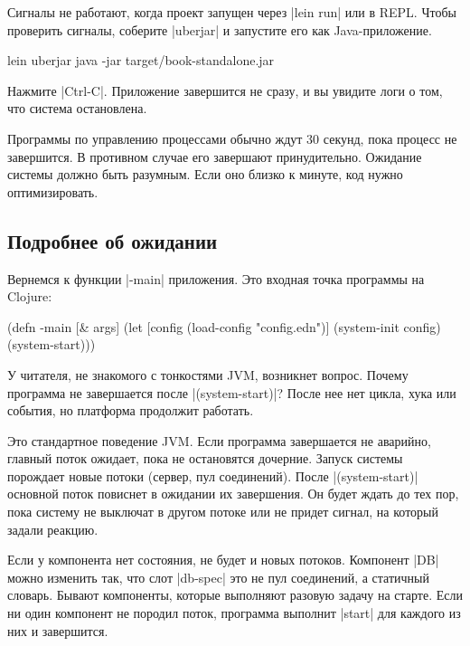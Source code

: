 Сигналы не работают, когда проект запущен через \spverb|lein run| или в
REPL. Чтобы проверить сигналы, соберите \spverb|uberjar| и запустите его как
Java-приложение.

\begin{english}
  \begin{bash}
lein uberjar
java -jar target/book-standalone.jar
  \end{bash}
\end{english}

Нажмите \spverb|Ctrl-C|. Приложение завершится не сразу, и вы увидите логи о
том, что система остановлена.

Программы по управлению процессами обычно ждут 30 секунд, пока процесс не
завершится. В противном случае его завершают принудительно. Ожидание системы
должно быть разумным. Если оно близко к минуте, код нужно оптимизировать.

\subsection{Подробнее об ожидании}

Вернемся к функции \spverb|-main| приложения. Это входная точка программы на
Clojure:

\begin{english}
  \begin{clojure}
(defn -main [& args]
  (let [config (load-config "config.edn")]
    (system-init config)
    (system-start)))
  \end{clojure}
\end{english}

У читателя, не знакомого с тонкостями JVM, возникнет вопрос. Почему программа не
завершается после \spverb|(system-start)|? После нее нет цикла, хука или
события, но платформа продолжит работать.

Это стандартное поведение JVM. Если программа завершается не аварийно, главный
поток ожидает, пока не остановятся дочерние. Запуск системы порождает новые
потоки (сервер, пул соединений). После \spverb|(system-start)| основной поток
повиснет в ожидании их завершения. Он будет ждать до тех пор, пока систему не
выключат в другом потоке или не придет сигнал, на который задали реакцию.

Если у компонента нет состояния, не будет и новых потоков. Компонент \spverb|DB|
можно изменить так, что слот \spverb|db-spec| это не пул соединений, а статичный
словарь. Бывают компоненты, которые выполняют разовую задачу на старте. Если ни
один компонент не породил поток, программа выполнит \spverb|start| для каждого
из них и завершится.

